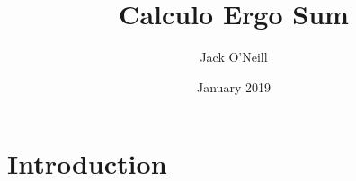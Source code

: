 \documentclass{article}
\title{Calculo Ergo Sum}
\author{Jack O'Neill}
\date{January 2019}
\begin{document}
\maketitle

\section{Introduction}
\end{document}
